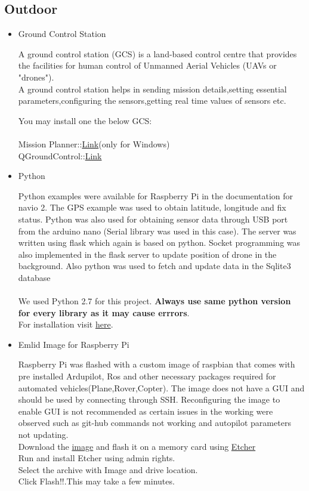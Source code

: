 \documentclass[a4paper,12pt,oneside]{book}
\begin{document}
  \subsection{Outdoor}
  \begin{itemize}
  \item Ground Control Station
  
  A ground control station (GCS) is a land-based control centre that provides the facilities for human control of Unmanned Aerial Vehicles (UAVs or "drones").\\ A ground control station helps in sending mission details,setting essential parameters,configuring the sensors,getting real time values of sensors etc.
  
  You may install one the below GCS:\\ \\
  Mission Planner::\href{http://ardupilot.org/planner/docs/common-install-mission-planner.html}{Link}(only for Windows)\\
  QGroundControl::\href{https://docs.qgroundcontrol.com/en/getting_started/download_and_install.html}{Link}
  
  \item Python 
  
  Python examples were available for Raspberry Pi in the documentation for navio 2. The GPS example was used to obtain latitude, longitude and fix status. Python was also used for obtaining sensor data through USB port from the arduino nano (Serial library was used in this case). The server was written using flask which again is based on python. Socket programming was also implemented in the flask server to update position of drone in the background. Also python was used to fetch and update data in the Sqlite3 database   \\ \\
  We used Python 2.7 for this project.
  \textbf{Always use same python version for every library as it may cause errrors}.\\
  For installation visit \href{https://www.python.org/getit/}{here}.
  
  \item Emlid Image for Raspberry Pi
  
  Raspberry Pi was flashed with a custom image of raspbian that comes with pre installed Ardupilot, Ros and other necessary packages required for automated vehicles(Plane,Rover,Copter). The image does not have a GUI and should be used by connecting through SSH. Reconfiguring the image to enable GUI is not recommended as certain issues in the working were observed such as git-hub commands not working and autopilot parameters not updating. \\Download the \href{http://files.emlid.com/images/emlid-raspbian-20180525.img.xz}{image} and flash it on a memory card using \href{https://etcher.io/}{Etcher}
  \\
  Run and install Etcher using admin rights.\\Select the archive with Image and drive location.\\Click Flash!!.This may take a few minutes.
  

\end{itemize}
\end{document}
